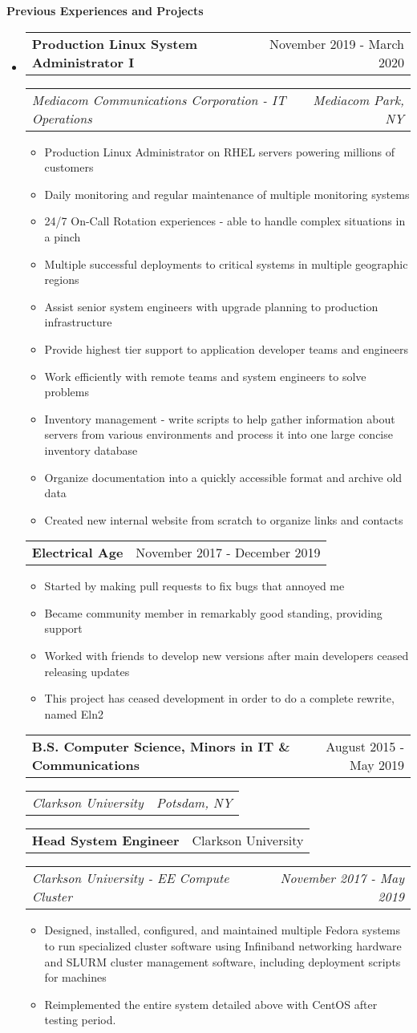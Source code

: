 \documentclass[letterpaper,12pt]{article}
\makeatletter
\newcommand{\resitem}[1]{\item #1 \vspace{-3pt}}
\newcommand{\resheading}[1]{{\large {\textbf{#1 \vphantom{p\^{E}}}}}\vspace{-3pt}}
\newcommand{\topheading}[2]{
\begin{tabular*}{6.5in}{l@{\extracolsep{\fill}}r}
		\textbf{#1} & #2 \\
\end{tabular*}}
\newcommand{\bottomheading}[2]{
\begin{tabular*}{6.5in}{l@{\extracolsep{\fill}}r}
		\textit{#1} & \textit{#2} \\
\end{tabular*}\vspace{-6pt}}
\newcommand{\singleheading}[2]{
\vspace{6pt}
\begin{tabular*}{6.5in}{l@{\extracolsep{\fill}}r}
		\textbf{#1} & #2 \\
\end{tabular*}
\vspace{-3pt}
}
\makeatother
\begin{document}
\resheading{Previous Experiences and Projects}
\begin{itemize}
	\item[]

	\topheading{Production Linux System Administrator I}{November 2019 - March 2020}
	\bottomheading{Mediacom Communications Corporation - IT Operations}{Mediacom Park, NY}
	\begin{itemize}
		\resitem{Production Linux Administrator on RHEL servers powering millions of customers}
		\resitem{Daily monitoring and regular maintenance of multiple monitoring systems}
		\resitem{24/7 On-Call Rotation experiences - able to handle complex situations in a pinch}
		\resitem{Multiple successful deployments to critical systems in multiple geographic regions}
		\resitem{Assist senior system engineers with upgrade planning to production infrastructure}
		\resitem{Provide highest tier support to application developer teams and engineers}
		\resitem{Work efficiently with remote teams and system engineers to solve problems}
		\resitem{Inventory management - write scripts to help gather information about servers from various environments and process it into one large concise inventory database}
		\resitem{Organize documentation into a quickly accessible format and archive old data}
		\resitem{Created new internal website from scratch to organize links and contacts}
	\end{itemize}

	\singleheading{Electrical Age}{November 2017 - December 2019}
	\begin{itemize}
		\resitem{Started by making pull requests to fix bugs that annoyed me}
		\resitem{Became community member in remarkably good standing, providing support}
		\resitem{Worked with friends to develop new versions after main developers ceased releasing updates}
		\resitem{This project has ceased development in order to do a complete rewrite, named Eln2}
	\end{itemize}

	\vspace{6pt}

	\topheading{B.S. Computer Science, Minors in IT \& Communications}{August 2015 - May 2019}
	\bottomheading{Clarkson University}{Potsdam, NY}

	\vspace{6pt}

	\topheading{Head System Engineer}{Clarkson University}
	\bottomheading{Clarkson University - EE Compute Cluster}{November 2017 - May 2019}
	\begin{itemize}
		\resitem{Designed, installed, configured, and maintained multiple Fedora systems to run specialized cluster software using Infiniband networking hardware and SLURM cluster management software, including deployment scripts for machines}
		\resitem{Reimplemented the entire system detailed above with CentOS after testing period.}
	\end{itemize}


\end{itemize}
\end{document}
